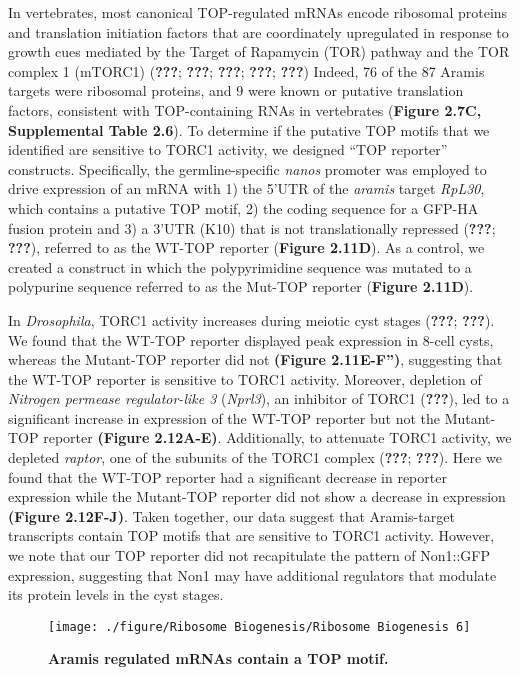 \documentclass[12pt,oneside]{reedthesis}
\begin{document}
In vertebrates, most canonical TOP-regulated mRNAs encode ribosomal proteins and translation initiation factors that are coordinately upregulated in response to growth cues mediated by the Target of Rapamycin (TOR) pathway and the TOR complex 1 (mTORC1) ({\textbf{???}}; {\textbf{???}}; {\textbf{???}}; {\textbf{???}}; {\textbf{???}}) Indeed, 76 of the 87 Aramis targets were ribosomal proteins, and 9 were known or putative translation factors, consistent with TOP-containing RNAs in vertebrates (\textbf{Figure 2.7C, Supplemental Table 2.6}). To determine if the putative TOP motifs that we identified are sensitive to TORC1 activity, we designed ``TOP reporter'' constructs. Specifically, the germline-specific \emph{nanos} promoter was employed to drive expression of an mRNA with 1) the 5'UTR of the \emph{aramis} target \emph{RpL30}, which contains a putative TOP motif, 2) the coding sequence for a GFP-HA fusion protein and 3) a 3'UTR (K10) that is not translationally repressed ({\textbf{???}}; {\textbf{???}}), referred to as the WT-TOP reporter (\textbf{Figure 2.11D}). As a control, we created a construct in which the polypyrimidine sequence was mutated to a polypurine sequence referred to as the Mut-TOP reporter (\textbf{Figure 2.11D}).

In \emph{Drosophila}, TORC1 activity increases during meiotic cyst stages ({\textbf{???}}; {\textbf{???}}). We found that the WT-TOP reporter displayed peak expression in 8-cell cysts, whereas the Mutant-TOP reporter did not \textbf{(Figure 2.11E-F'')}, suggesting that the WT-TOP reporter is sensitive to TORC1 activity. Moreover, depletion of \emph{Nitrogen permease regulator-like 3} (\emph{Nprl3}), an inhibitor of TORC1 ({\textbf{???}}), led to a significant increase in expression of the WT-TOP reporter but not the Mutant-TOP reporter \textbf{(Figure 2.12A-E)}. Additionally, to attenuate TORC1 activity, we depleted \emph{raptor}, one of the subunits of the TORC1 complex ({\textbf{???}}; {\textbf{???}}). Here we found that the WT-TOP reporter had a significant decrease in reporter expression while the Mutant-TOP reporter did not show a decrease in expression \textbf{(Figure 2.12F-J)}. Taken together, our data suggest that Aramis-target transcripts contain TOP motifs that are sensitive to TORC1 activity. However, we note that our TOP reporter did not recapitulate the pattern of Non1::GFP expression, suggesting that Non1 may have additional regulators that modulate its protein levels in the cyst stages.
\begin{figure}

{\centering \texttt{[image: ./figure/Ribosome Biogenesis/Ribosome Biogenesis 6]} 

}

\caption[\textbf{Aramis regulated mRNAs contain a TOP motif.}]{\textbf{Aramis regulated mRNAs contain a TOP motif.}}\label{fig:unnamed-chunk-16}
\end{figure}
\end{document}
